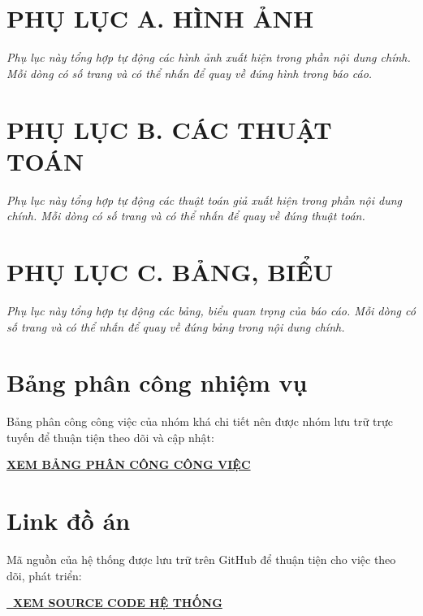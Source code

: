 \documentclass[12pt,a4paper]{article}
\makeatletter
\numberwithin{figure}{subsection}
\numberwithin{table}{subsection}
\newcommand{\appendixnote}[1]{\par\smallskip\noindent\textit{#1}\par\medskip}
\newcommand{\printappendixfigures}{\@starttoc{lof}}
\newcommand{\printappendixtables}{\@starttoc{lot}}
\newcommand{\printappendixalgorithms}{\@starttoc{loa}}
\makeatother
\begin{document}
\newpage
\pagestyle{plain}


\clearpage
\section*{PHỤ LỤC A. HÌNH ẢNH}
{}
\appendixnote{Phụ lục này tổng hợp tự động các hình ảnh xuất hiện trong phần nội dung chính. Mỗi dòng có số trang và có thể nhấn để quay về đúng hình trong báo cáo.}
\printappendixfigures

\clearpage
\section*{PHỤ LỤC B. CÁC THUẬT TOÁN}
{}
\appendixnote{Phụ lục này tổng hợp tự động các thuật toán giả xuất hiện trong phần nội dung chính. Mỗi dòng có số trang và có thể nhấn để quay về đúng thuật toán.}
\printappendixalgorithms

\clearpage
\section*{PHỤ LỤC C. BẢNG, BIỂU}
{}
\appendixnote{Phụ lục này tổng hợp tự động các bảng, biểu quan trọng của báo cáo. Mỗi dòng có số trang và có thể nhấn để quay về đúng bảng trong nội dung chính.}
\printappendixtables
\newpage
\section*{Bảng phân công nhiệm vụ}
{}

Bảng phân công công việc của nhóm khá chi tiết nên được nhóm lưu trữ trực tuyến để thuận tiện theo dõi và cập nhật:

\begin{center}
\textbf{\Large
\href{https://docs.google.com/spreadsheets/d/1orHbU9IxSBTTOqu8nbCmwukOrbziY6j6/edit?gid=91630022\#gid=91630022}
{XEM BẢNG PHÂN CÔNG CÔNG VIỆC}
}
\end{center}

\hypersetup{
    colorlinks=true,
    urlcolor=blue
}

\section*{Link đồ án}
{}

Mã nguồn của hệ thống được lưu trữ trên GitHub để thuận tiện cho việc theo dõi, phát triển:

\begin{center}
\textbf{\Large
\href{https://github.com/hoanganh-kevz/StudentManagement}
{\faGithub\ XEM SOURCE CODE HỆ THỐNG}
}
\end{center}
\end{document}
